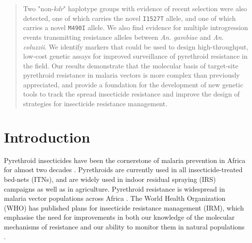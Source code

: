 \documentclass[a4paper,11pt,abstracton,hidelinks]{scrartcl}
\begin{document}
\begin{abstract}
%
Two "non-\textit{kdr}" haplotype groups with evidence of recent selection were also detected, one of which carries the novel \texttt{I1527T} allele, and one of which carries a novel \texttt{M490I} allele.
%
We also find evidence for multiple introgression events transmitting resistance alleles between \textit{An. gambiae} and \textit{An. coluzzii}.
%
We identify markers that could be used to design high-throughput, low-cost genetic assays for improved surveillance of pyrethroid resistance in the field.
%
Our results demonstrate that the molecular basis of target-site pyrethroid resistance in malaria vectors is more complex than previously appreciated, and provide a foundation for the development of new genetic tools to track the spread insecticide resistance and improve the design of strategies for insecticide resistance management.

\end{abstract}


\section*{Introduction}


Pyrethroid insecticides have been the cornerstone of malaria prevention in Africa for almost two decades \cite{Bhatt2015}.
%
Pyrethroids are currently used in all insecticide-treated bed-nets (ITNs), and are widely used in indoor residual spraying (IRS) campaigns as well as in agriculture.
%
Pyrethroid resistance is widespread in malaria vector populations across Africa \cite{Hemingway2016}.
%
The World Health Organization (WHO) has published plans for insecticide resistance management (IRM), which emphasise the need for improvements in both our knowledge of the molecular mechanisms of resistance and our ability to monitor them in natural populations \cite{WorldHealthOrganization2012,world2017global}.
\end{document}
